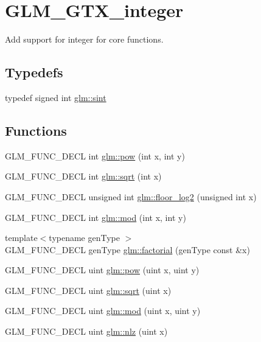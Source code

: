 \hypertarget{group__gtx__integer}{\section{G\-L\-M\-\_\-\-G\-T\-X\-\_\-integer}
\label{group__gtx__integer}
}


Add support for integer for core functions.  


\subsection*{Typedefs}
\begin{DoxyCompactItemize}
\item 
typedef signed int \hyperlink{group__gtx__integer_ga73643e09d8c6d362418aec541fdb987d}{glm\-::sint}
\end{DoxyCompactItemize}
\subsection*{Functions}
\begin{DoxyCompactItemize}
\item 
G\-L\-M\-\_\-\-F\-U\-N\-C\-\_\-\-D\-E\-C\-L int \hyperlink{group__gtx__integer_ga89c591b970882714bd1e89a4e2f249f1}{glm\-::pow} (int x, int y)
\item 
G\-L\-M\-\_\-\-F\-U\-N\-C\-\_\-\-D\-E\-C\-L int \hyperlink{group__gtx__integer_ga7ce36693a75879ccd9bb10167cfa722d}{glm\-::sqrt} (int x)
\item 
G\-L\-M\-\_\-\-F\-U\-N\-C\-\_\-\-D\-E\-C\-L unsigned int \hyperlink{group__gtx__integer_ga7011b4e1c1e1ed492149b028feacc00e}{glm\-::floor\-\_\-log2} (unsigned int x)
\item 
G\-L\-M\-\_\-\-F\-U\-N\-C\-\_\-\-D\-E\-C\-L int \hyperlink{group__gtx__integer_gaabfbb41531ab7ad8d06fc176edfba785}{glm\-::mod} (int x, int y)
\item 
{\footnotesize template$<$typename gen\-Type $>$ }\\G\-L\-M\-\_\-\-F\-U\-N\-C\-\_\-\-D\-E\-C\-L gen\-Type \hyperlink{group__gtx__integer_ga8cbd3120905f398ec321b5d1836e08fb}{glm\-::factorial} (gen\-Type const \&x)
\item 
G\-L\-M\-\_\-\-F\-U\-N\-C\-\_\-\-D\-E\-C\-L uint \hyperlink{group__gtx__integer_ga998e5ee915d3769255519e2fbaa2bbf0}{glm\-::pow} (uint x, uint y)
\item 
G\-L\-M\-\_\-\-F\-U\-N\-C\-\_\-\-D\-E\-C\-L uint \hyperlink{group__gtx__integer_ga1975d318978d6dacf78b6444fa5ed7bc}{glm\-::sqrt} (uint x)
\item 
G\-L\-M\-\_\-\-F\-U\-N\-C\-\_\-\-D\-E\-C\-L uint \hyperlink{group__gtx__integer_ga63fc8d63e7da1706439233b386ba8b6f}{glm\-::mod} (uint x, uint y)
\item 
G\-L\-M\-\_\-\-F\-U\-N\-C\-\_\-\-D\-E\-C\-L uint \hyperlink{group__gtx__integer_ga78dff8bdb361bf0061194c93e003d189}{glm\-::nlz} (uint x)
\end{DoxyCompactItemize}


